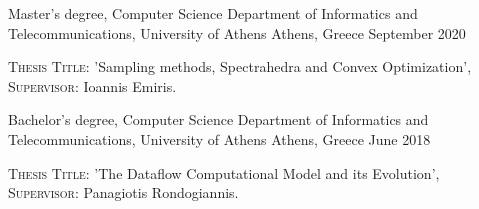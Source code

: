 

\begin{cventries}


	\cventry
	{Master's degree, Computer Science} %
	{Department of Informatics and Telecommunications, University of Athens} %
	{Athens, Greece} %
	{September 2020} %
	{
		\begin{cvitems} %
			\item {{\fontsize{8pt}{1em}\bodyfont\scshape Thesis Title}: 'Sampling methods, Spectrahedra and Convex Optimization', \\ {\fontsize{8pt}{1em}\bodyfont\scshape Supervisor}: Ioannis Emiris.}
		\end{cvitems}
	}

  \cventry
    {Bachelor's degree, Computer Science} %
    {Department of Informatics and Telecommunications, University of Athens} %
    {Athens, Greece} %
    {June 2018} %
    {
      \begin{cvitems} %
        \item {{\fontsize{8pt}{1em}\bodyfont\scshape Thesis Title}: 'The Dataflow Computational Model and its Evolution', \\ {\fontsize{8pt}{1em}\bodyfont\scshape Supervisor}: Panagiotis Rondogiannis.}
      \end{cvitems}
    }


\end{cventries}
